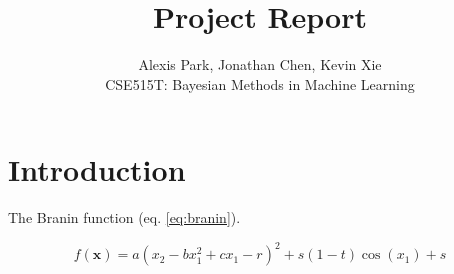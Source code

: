 \documentclass[11pt]{article}
\newcommand{\Course}{CSE515T: Bayesian Methods in Machine Learning}
\numberwithin{equation}{section}
\begin{document}
\title{Project Report}
\author{Alexis Park, Jonathan Chen, Kevin Xie \\ \Course}
\maketitle

\section{Introduction}

The Branin function (eq. \ref{eq:branin}).

\begin{equation}
  f(\bm{x}) = a(x_2 - bx_1^2 + cx_1 - r)^2 + s(1 - t)\cos(x_1) + s
  \label{eq:branin}
\end{equation}
\end{document}
